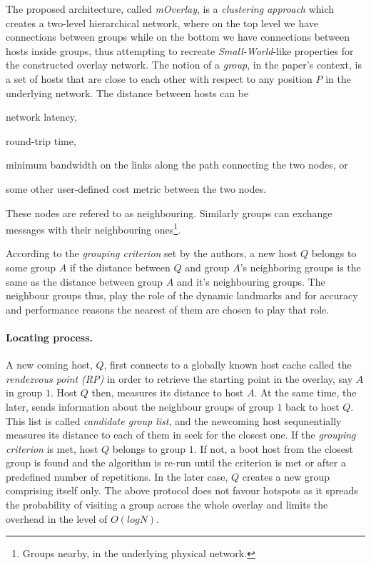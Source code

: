 \documentclass[a4paper,10pt]{article}
\begin{document}
The proposed architecture, called \emph{mOverlay}, is a \emph{clustering approach} which creates a two-level hierarchical network, where on the top level we have connections between groups while on the bottom we have connections between hosts inside groups, thus attempting to recreate \emph{Small-World}-like properties for the constructed overlay network. The notion of a \emph{group}, in the paper's context, is a set of hosts that are close to each other with respect to any position $P$ in the underlying network. The distance between hosts can be 
\begin{inparaenum}
  \item network latency,
  \item round-trip time,
  \item minimum bandwidth on the links along the path connecting the two nodes, or
  \item some other user-defined cost metric between the two nodes.
\end{inparaenum}
These nodes are refered to as neighbouring. Similarly groups can exchange messages with their neighbouring ones\footnote{Groups nearby, in the underlying physical network.}.

According to the \emph{grouping criterion} set by the authors, a new host $Q$ belongs to some group $A$ if the distance between $Q$ and group $A$'s neighboring groups is the same as the distance between group $A$ and it's neighbouring groups. The neighbour groups thus, play the role of the dynamic landmarks and for accuracy and performance reasons the nearest of them are chosen to play that role.

\paragraph{Locating process.} A new coming host, $Q$, first connects to a globally known host cache called the \emph{rendezvous point (RP)} in order to retrieve the starting point in the overlay, say $A$ in group $1$. Host $Q$ then, measures its distance to host $A$. At the same time, the later, sends information about the neighbour groups of group $1$ back to host $Q$. This list is called \emph{candidate group list}, and the newcoming host sequnentially measures its distance to each of them in seek for the closest one. If the \emph{grouping criterion} is met, host $Q$ belongs to group $1$. If not, a boot host from the closest group is found and the algorithm is re-run until the criterion is met or after a predefined number of repetitions. In the later case, $Q$ creates a new group comprising itself only. The above protocol does not favour hotspots as it spreads the probability of visiting a group across the whole overlay and limits the overhead in the level of $O \left ( log N \right )$.
\end{document}
